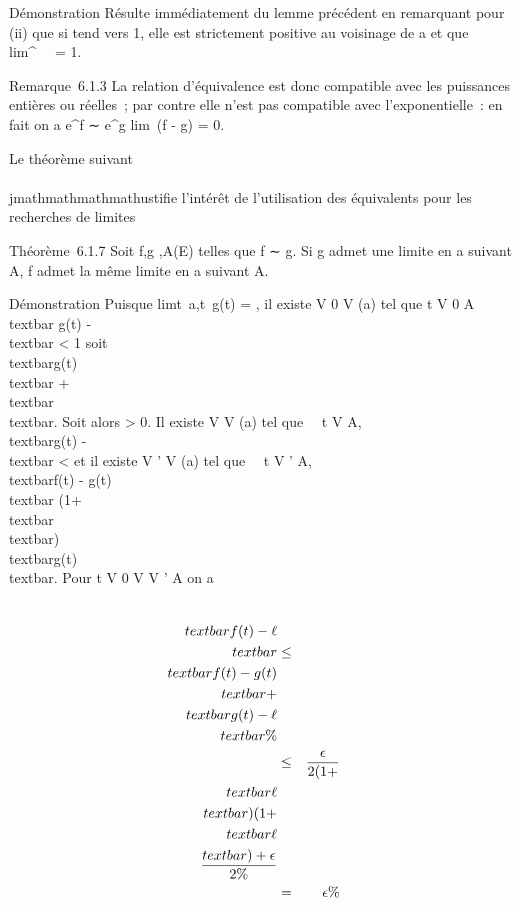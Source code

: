 Démonstration Résulte immédiatement du lemme précédent en remarquant
pour (ii) que si \phi tend vers 1, elle est strictement positive au
voisinage de a et que lim\phi^\alpha~~ = 1.

Remarque~6.1.3 La relation d'équivalence est donc compatible avec les
puissances entières ou réelles~; par contre elle n'est pas compatible
avec l'exponentielle~: en fait on a e^f ∼ e^g
\Leftrightarrow lim~(f - g) = 0.

Le théorème suivant \\\\jmathmathmathmathustifie l'intérêt de l'utilisation des équivalents
pour les recherches de limites

Théorème~6.1.7 Soit f,g ,A(E) telles que f ∼ g. Si g admet
une limite \ell en a suivant A, f admet la même limite en a suivant A.

Démonstration Puisque limt\rightarrow~a,t\inA~g(t)
= \ell, il existe V 0 \in V (a) tel que t \in V 0 \bigcap A
\rigtharrow~\\textbar{} g(t) - \ell\\textbar{}
\textless{} 1 soit
\\textbar{}g(t)\\textbar{} 
+\\textbar{} \ell\\textbar{}. Soit alors \epsilon
\textgreater{} 0. Il existe V \in V (a) tel que
\forall~~t \in V \bigcap A, \\textbar{}g(t) -
\ell\\textbar{} \textless{} \epsilon {} et
il existe V ' \in V (a) tel que \forall~~t \in V ' \bigcap A,
\\textbar{}f(t) - g(t)\\textbar{} \leq \epsilon
{}(1+\\textbar{}\ell\\textbar{})
\\textbar{}g(t)\\textbar{}. Pour t \in V
0 \bigcap V \bigcap V ' \bigcap A on a

\begin{align*} \\textbar{}f(t) -
\ell\\textbar{}& \leq& \\textbar{}f(t) -
g(t)\\textbar{} +\\textbar{} g(t) -
\ell\\textbar{}\%& \\ &
\leq& \epsilon \over 2(1 +\\textbar{}
\ell\\textbar{}) (1 +\\textbar{}
\ell\\textbar{}) + \epsilon \over 2 \%&
\\ & =& \epsilon \%&
\\ \end{align*}

